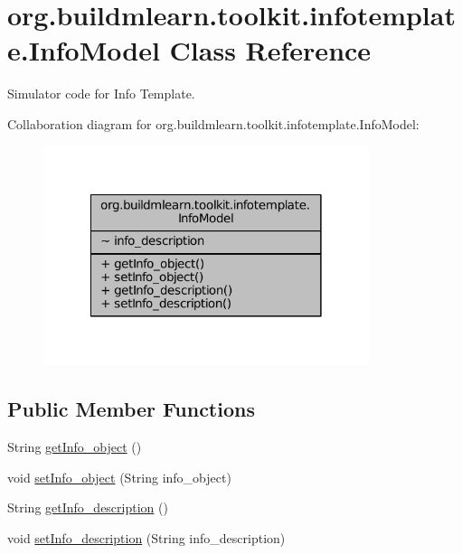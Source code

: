 \hypertarget{classorg_1_1buildmlearn_1_1toolkit_1_1infotemplate_1_1InfoModel}{\section{org.\-buildmlearn.\-toolkit.\-infotemplate.\-Info\-Model Class Reference}
\label{classorg_1_1buildmlearn_1_1toolkit_1_1infotemplate_1_1InfoModel}
}


Simulator code for Info Template.  




Collaboration diagram for org.\-buildmlearn.\-toolkit.\-infotemplate.\-Info\-Model\-:
\nopagebreak
\begin{figure}[H]
\begin{center}
\leavevmode
\includegraphics[width=270pt]{d3/dbc/classorg_1_1buildmlearn_1_1toolkit_1_1infotemplate_1_1InfoModel__coll__graph}
\end{center}
\end{figure}
\subsection*{Public Member Functions}
\begin{DoxyCompactItemize}
\item 
String \hyperlink{classorg_1_1buildmlearn_1_1toolkit_1_1infotemplate_1_1InfoModel_aa1f40de4a1f2b4eecdb69f4a449b015b}{get\-Info\-\_\-object} ()
\item 
void \hyperlink{classorg_1_1buildmlearn_1_1toolkit_1_1infotemplate_1_1InfoModel_a028f6fa4a7e5abc3ca2aa99cda4b59cd}{set\-Info\-\_\-object} (String info\-\_\-object)
\item 
String \hyperlink{classorg_1_1buildmlearn_1_1toolkit_1_1infotemplate_1_1InfoModel_a2f0005dd0a926471dbaa2c92e459d0df}{get\-Info\-\_\-description} ()
\item 
void \hyperlink{classorg_1_1buildmlearn_1_1toolkit_1_1infotemplate_1_1InfoModel_a983bb06e7e3f4d477d1059321981c5b3}{set\-Info\-\_\-description} (String info\-\_\-description)
\end{DoxyCompactItemize}


